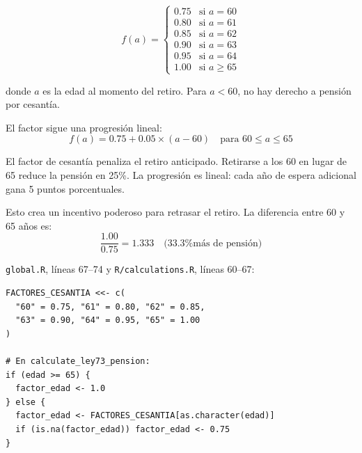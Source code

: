 \documentclass[11pt,a4paper]{report}
\theoremstyle{remark}
\begin{document}
\begin{tcolorbox}[colback=blue!5!white, colframe=blue!75!black, title=\textbf{Definici\'on Formal}]
\begin{equation}
f(a) = \begin{cases}
0.75 & \text{si } a = 60 \\
0.80 & \text{si } a = 61 \\
0.85 & \text{si } a = 62 \\
0.90 & \text{si } a = 63 \\
0.95 & \text{si } a = 64 \\
1.00 & \text{si } a \geq 65
\end{cases}
\label{eq:factores_cesantia}
\end{equation}

donde $a$ es la edad al momento del retiro. Para $a < 60$, no hay derecho a pensi\'on por cesant\'ia.

El factor sigue una progresi\'on lineal:
\begin{equation}
f(a) = 0.75 + 0.05 \times (a - 60) \quad \text{para } 60 \leq a \leq 65
\end{equation}
\end{tcolorbox}

\begin{tcolorbox}[colback=green!5!white, colframe=green!50!black, title=\textbf{Intuici\'on}]
El factor de cesant\'ia penaliza el retiro anticipado. Retirarse a los 60 en lugar de 65 reduce la pensi\'on en 25\%. La progresi\'on es lineal: cada a\~no de espera adicional gana 5 puntos porcentuales.

Esto crea un incentivo poderoso para retrasar el retiro. La diferencia entre 60 y 65 a\~nos es:
\[
\frac{1.00}{0.75} = 1.333 \quad \text{(33.3\% m\'as de pensi\'on)}
\]
\end{tcolorbox}

\begin{tcolorbox}[colback=orange!5!white, colframe=orange!75!black, title=\textbf{Aplicaci\'on en C\'odigo}]
\texttt{global.R}, l\'ineas 67--74 y \texttt{R/calculations.R}, l\'ineas 60--67:
\begin{lstlisting}
FACTORES_CESANTIA <<- c(
  "60" = 0.75, "61" = 0.80, "62" = 0.85,
  "63" = 0.90, "64" = 0.95, "65" = 1.00
)

# En calculate_ley73_pension:
if (edad >= 65) {
  factor_edad <- 1.0
} else {
  factor_edad <- FACTORES_CESANTIA[as.character(edad)]
  if (is.na(factor_edad)) factor_edad <- 0.75
}
\end{lstlisting}
\end{tcolorbox}
\end{document}
